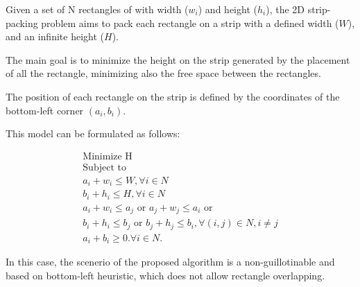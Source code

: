 Given a set of N rectangles of with width ($w_{i}$) and height ($h_{i}$),
the 2D strip-packing problem aims to pack each rectangle on a strip
with a defined width ($W$), and an infinite height ($H$).

The main goal is to minimize the height on the strip
generated by the placement of all the rectangle,
minimizing also the free space between the rectangles.

The position of each rectangle on the strip is defined
by the coordinates of the bottom-left corner $(a_{i},b_{i})$.

This model can be formulated as follows:

\begin{eqnarray}
\text{Minimize H}\nonumber \\
\text{Subject to}\nonumber \\
a_{i} + w_{i} \leq W, \forall i \in N \\
b_{i} + h_{i} \leq H, \forall i \in N \\
a_{i} + w_{i} \leq a_{j}\text{ or }a_{j} + w_{j} \leq a_{i}\text{ or }\nonumber\\
b_{i} + h_{i} \leq b_{j}\text{ or }b_{j} + h_{j} \leq b_{i}, \forall (i,j) \in N, i\neq j\\
a_{i} + b_{i} \geq 0. \forall i \in N.
\end{eqnarray}

In this case,
the scenerio of the proposed algorithm is a non-guillotinable
and based on bottom-left heuristic, which does not allow rectangle overlapping.
